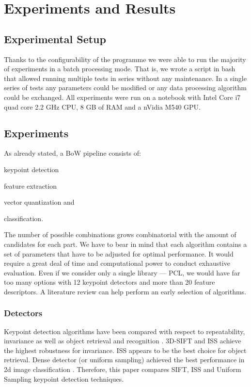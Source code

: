\chapter{Experiments and Results}

\section{Experimental Setup}
	Thanks to the configurability of the programme we were able to run the majority of experiments in a batch processing mode. That is, we wrote a script in bash that allowed running multiple tests in series without any maintenance. In a single series of tests any parameters could be modified or any data processing algorithm could be exchanged. All experiments were run on a notebook with Intel Core i7 quad core 2.2 GHz CPU, 8 GB of RAM and a nVidia M540 GPU.

\section{Experiments}	
	As already stated, a BoW pipeline consists of:
	\begin{inparaenum}[\upshape(1\upshape)]
	\item keypoint detection
	\item feature extraction 
	\item vector quantization and
	\item classification.
	\end{inparaenum}
	The number of possible combinations grows combinatorial with the amount of candidates for each part. We have to bear in mind that each algorithm contains a set of parameters that have to be adjusted for optimal performance. It would require a great deal of time and computational power to conduct exhaustive evaluation. Even if we consider only a single library --- PCL, we would have far too many options with 12 keypoint detectors and more than 20 feature descriptors. A literature review can help perform an early selection of algorithms.	
	
	\subsection{Detectors}
	Keypoint detection algorithms have been compared with respect to repeatability, invariance \cite{pcl_keypoint_comparision} as well as object retrieval and recognition \cite{3d_keypoint_eval}. 3D-SIFT and ISS achieve the highest robustness for invariance. ISS appears to be the best choice for object retrieval. Dense detector (or uniform sampling) achieved the best performance in 2d image classification \cite{tsai2012bag}. Therefore, this paper compares SIFT, ISS and Uniform Sampling keypoint detection techniques.
	

